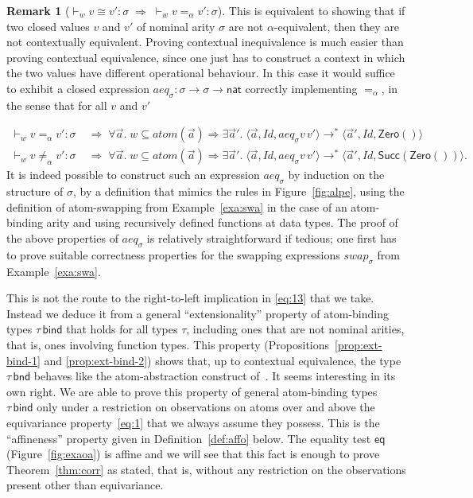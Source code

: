 \documentclass{LMCS}
\theoremstyle{plain}
\theoremstyle{definition}
\newtheorem{remark}[thm]{Remark}
\newcommand{\aeq}{=_{\alpha}}
\newcommand{\ar}[1][\sigma]{#1}
\newcommand{\atoms}{\mathit{atom}}
\newcommand{\BIND}{\kw{bind}}
\newcommand{\BINDTY}{\kw{bnd}}
\newcommand{\CON}[1][C]{\kw{#1}}
\newcommand{\config}[3]{\langle#1, #2, #3\rangle}
\newcommand{\ent}{\vdash}
\newcommand{\es}{\mathit{Id}}
\newcommand{\FUNTY}{\mathbin{\rightarrow}}
\newcommand{\imp}{\Rightarrow}
\newcommand{\kw}[1]{\mathsf{#1}}
\newcommand{\NAT}{\kw{nat}}
\newcommand{\ofty}{:}
\newcommand{\OFTY}{\mathrel{\kw{:}}}
\newcommand{\opeq}{\cong}
\newcommand{\s}[1][a]{\vec{#1}}
\newcommand{\trans}{\longrightarrow}
\newcommand{\ty}{\tau}
\newcommand{\val}[1][v]{#1}
\newcommand{\w}[1][w]{#1}
\begin{document}
\begin{remark}[${}\ent_{\w} \val \opeq\val'\ofty\ar \;\imp\; {}\ent_{\w}
  \val\aeq\val'\ofty \ar$]
  This is equivalent to showing that if two closed values $\val$ and
  $\val'$ of nominal arity $\ar$ are not $\alpha$-equivalent, then
  they are not contextually equivalent. Proving contextual
  inequivalence is much easier than proving contextual equivalence,
  since one just has to construct a context in which the two values
  have different operational behaviour. In this case it would suffice
  to exhibit a closed expression
  $\mathit{aeq}_{\ar}\OFTY\ar\FUNTY\ar\FUNTY\NAT$ correctly
  implementing $\aeq$, in the sense that for all $\val$ and $\val'$
  
  \begin{align*}
    {}\ent_{\w} \val\aeq\val'\ofty \ar &\;\imp\; \forall
    \s.\;\w\subseteq\atoms(\s)\imp\exists\s'.\;
    \config{\s}{\es}{\mathit{aeq}_{\ar}\val\,\val'}\trans^*
    \config{\s'}{\es}{\CON[Zero]()}\\
    {}\ent_{\w} \val\not\aeq\val'\ofty \ar &\;\imp\; \forall
    \s.\;\w\subseteq\atoms(\s)\imp\exists\s'.\;
    \config{\s}{\es}{\mathit{aeq}_{\ar}\val\,\val'}\trans^*
    \config{\s'}{\es}{\CON[Succ](\CON[Zero]())}.
  \end{align*}
  It is indeed possible to construct such an expression
  $\mathit{aeq}_{\ar}$ by induction on the structure of $\ar$, by a
  definition that mimics the rules in Figure~\ref{fig:alpe}, using
  the definition of atom-swapping from Example~\ref{exa:swa} in the
  case of an atom-binding arity and using recursively defined
  functions at data types. The proof of the above properties of
  $\mathit{aeq}_{\ar}$ is relatively straightforward if tedious; one
  first has to prove suitable correctness properties for the swapping
  expressions $\mathit{swap}_{\ar}$ from Example~\ref{exa:swa}.

  This is not the route to the right-to-left implication in
  \eqref{eq:13} that we take. Instead we deduce it from a general
  ``extensionality'' property of atom-binding types $\ty\,\BIND$ that
  holds for all types $\ty$, including ones that are not nominal
  arities, that is, ones involving function types. This property
  (Propositions~\ref{prop:ext-bind-1} and \ref{prop:ext-bind-2}) shows
  that, up to contextual equivalence, the type $\ty\,\BINDTY$ behaves
  like the atom-abstraction construct
  of~\cite[Sect.~5]{PittsAM:newaas-jv}. It seems interesting in its
  own right. We are able to prove this property of general
  atom-binding types $\ty\,\BIND$ only under a restriction on
  observations on atoms over and above the equivariance
  property~\eqref{eq:1} that we always assume they possess. This is
  the ``affineness'' property given in Definition~\ref{def:affo}
  below. The equality test $\CON[eq]$ (Figure~\ref{fig:exaoa}) is
  affine and we will see that this fact is enough to prove
  Theorem~\ref{thm:corr} as stated, that is, without any restriction
  on the observations present other than equivariance.
\end{remark}
\end{document}
